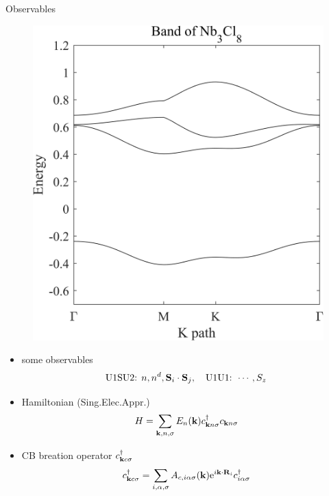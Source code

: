 \documentclass{beamer}
\begin{document}
\begin{frame}{Observables}
	\begin{multicols}{2}
		\begin{figure}[H]
			\includegraphics[width=1\linewidth]{figures/band.png}
		\end{figure}
		\newpage
		\begin{itemize}
			\item some observables
			\begin{equation*}
				\text{U1SU2: }n, n^d, \vb{S}_i\cdot \vb{S}_j,\quad \text{U1U1: }\cdots,S_z
			\end{equation*}
			\item Hamiltonian (Sing.Elec.Appr.)
			\begin{equation*}
				H = \sum_{\vb{k},n,\sigma}E_n(\vb{k})c^\dagger_{\vb{k}n\sigma}c_{\vb{k}n\sigma}
			\end{equation*}
			\item CB breation operator $c^\dagger_{\vb{k}c\sigma}$
			\begin{equation*}
				c^\dagger_{\vb{k}c\sigma}=\sum_{i,\alpha,\sigma}A_{c,i\alpha\sigma}(\vb{k})\mathrm{e}^{i\vb{k}\cdot \vb{R}_i}c^\dagger_{i\alpha\sigma}
			\end{equation*}
		\end{itemize}
	\end{multicols}
\end{frame}
\end{document}
